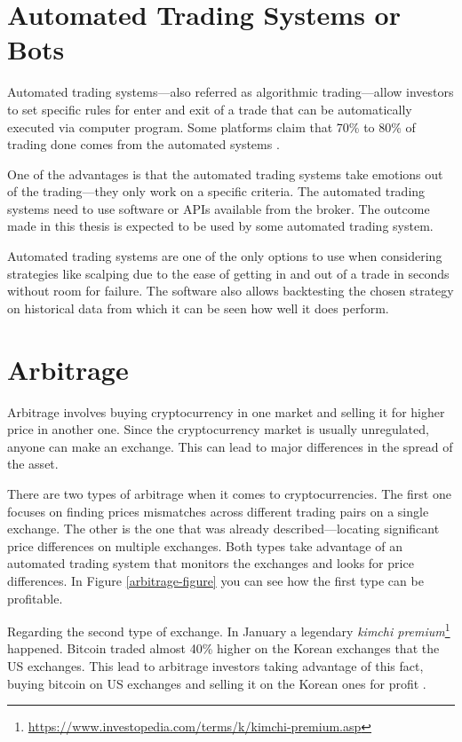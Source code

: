\section{Automated Trading Systems or Bots}
\label{bots}
Automated trading systems---also referred as algorithmic trading---allow investors to set specific rules for enter and exit of a trade that can be automatically executed via computer program. Some platforms claim that 70\% to 80\% of trading done comes from the automated systems \cite{investopedia-bot-trading}.

One of the advantages is that the automated trading systems take emotions out of the trading---they only work on a specific criteria. The automated trading systems need to use software or APIs available from the broker. The outcome made in this thesis is expected to be used by some automated trading system.

Automated trading systems are one of the only options to use when considering strategies like scalping due to the ease of getting in and out of a trade in seconds without room for failure. The software also allows backtesting the chosen strategy on historical data from which it can be seen how well it does perform.

\section{Arbitrage}
Arbitrage involves buying cryptocurrency in one market and selling it for higher price in another one. Since the cryptocurrency market is usually unregulated, anyone can make an exchange. This can lead to major differences in the spread of the asset.

There are two types of arbitrage when it comes to cryptocurrencies. The first one focuses on finding prices mismatches across different trading pairs on a single exchange. The other is the one that was already described---locating significant price differences on multiple exchanges. Both types take advantage of an automated trading system that monitors the exchanges and looks for price differences. In Figure \ref{arbitrage-figure} you can see how the first type can be profitable.

Regarding the second type of exchange. In January a legendary \emph{kimchi premium}\footnote{\url{https://www.investopedia.com/terms/k/kimchi-premium.asp}} happened. Bitcoin traded almost 40\% higher on the Korean exchanges that the US exchanges. This lead to arbitrage investors taking advantage of this fact, buying bitcoin on US exchanges and selling it on the Korean ones for profit \cite{hodlbot:day-trading-cryptocurrency}.

